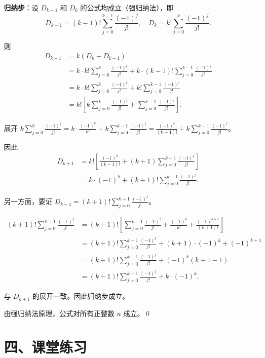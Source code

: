 \documentclass[12pt, a4paper]{ctexart}
\begin{document}
\textbf{归纳步}：设 $D_{k-1}$ 和 $D_k$ 的公式均成立（强归纳法），即
\[ D_{k-1} = (k-1)!\sum_{j=0}^{k-1}\frac{(-1)^j}{j!}, \quad D_k = k!\sum_{j=0}^{k}\frac{(-1)^j}{j!}. \]

则
\begin{align*}
D_{k+1} &= k(D_k + D_{k-1}) \\
&= k \cdot k!\sum_{j=0}^{k}\frac{(-1)^j}{j!} + k \cdot (k-1)!\sum_{j=0}^{k-1}\frac{(-1)^j}{j!} \\
&= k \cdot k!\sum_{j=0}^{k}\frac{(-1)^j}{j!} + k!\sum_{j=0}^{k-1}\frac{(-1)^j}{j!} \\
&= k!\left[k\sum_{j=0}^{k}\frac{(-1)^j}{j!} + \sum_{j=0}^{k-1}\frac{(-1)^j}{j!}\right].
\end{align*}

展开 $k \displaystyle\sum_{j=0}^{k}\frac{(-1)^j}{j!} = k \cdot \frac{(-1)^k}{k!} + k\sum_{j=0}^{k-1}\frac{(-1)^j}{j!} = \frac{(-1)^k}{(k-1)!} + k\sum_{j=0}^{k-1}\frac{(-1)^j}{j!}$。

因此
\begin{align*}
D_{k+1} &= k!\left[\frac{(-1)^k}{(k-1)!} + (k+1)\sum_{j=0}^{k-1}\frac{(-1)^j}{j!}\right] \\
&= k \cdot (-1)^k + (k+1)!\sum_{j=0}^{k-1}\frac{(-1)^j}{j!}.
\end{align*}

另一方面，要证 $D_{k+1} = (k+1)!\displaystyle\sum_{j=0}^{k+1}\frac{(-1)^j}{j!}$。

\begin{align*}
(k+1)!\sum_{j=0}^{k+1}\frac{(-1)^j}{j!} &= (k+1)!\left[\sum_{j=0}^{k-1}\frac{(-1)^j}{j!} + \frac{(-1)^k}{k!} + \frac{(-1)^{k+1}}{(k+1)!}\right] \\
&= (k+1)!\sum_{j=0}^{k-1}\frac{(-1)^j}{j!} + (k+1) \cdot (-1)^k + (-1)^{k+1} \\
&= (k+1)!\sum_{j=0}^{k-1}\frac{(-1)^j}{j!} + (-1)^k(k+1-1) \\
&= (k+1)!\sum_{j=0}^{k-1}\frac{(-1)^j}{j!} + k \cdot (-1)^k.
\end{align*}

与 $D_{k+1}$ 的展开一致。因此归纳步成立。

由强归纳法原理，公式对所有正整数 $n$ 成立。\qed

\section*{\textcolor{tipgreen}{四、课堂练习}}
\end{document}
